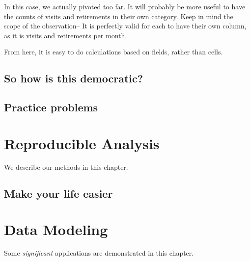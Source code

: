 \documentclass[]{book}
\newenvironment{Shaded}{\begin{snugshade}}{\end{snugshade}}
\newcommand{\KeywordTok}[1]{\textcolor[rgb]{0.13,0.29,0.53}{\textbf{#1}}}
\newcommand{\DataTypeTok}[1]{\textcolor[rgb]{0.13,0.29,0.53}{#1}}
\newcommand{\StringTok}[1]{\textcolor[rgb]{0.31,0.60,0.02}{#1}}
\newcommand{\OperatorTok}[1]{\textcolor[rgb]{0.81,0.36,0.00}{\textbf{#1}}}
\newcommand{\NormalTok}[1]{#1}
\begin{document}
In this case, we actually pivoted too far. It will probably be more
useful to have the counts of visits and retirements in their own
category. Keep in mind the scope of the observation-- It is perfectly
valid for each to have their own column, as it is visits and retirements
per month.

\begin{Shaded}
\end{Shaded}

From here, it is easy to do calculations based on fields, rather than
cells.

\section{So how is this democratic?}\label{so-how-is-this-democratic}

\section{Practice problems}\label{practice-problems}

\chapter{Reproducible Analysis}\label{reproducible-analysis}

We describe our methods in this chapter.

\section{Make your life easier}\label{make-your-life-easier}

\chapter{Data Modeling}\label{data-modeling}

Some \emph{significant} applications are demonstrated in this chapter.
\end{document}
